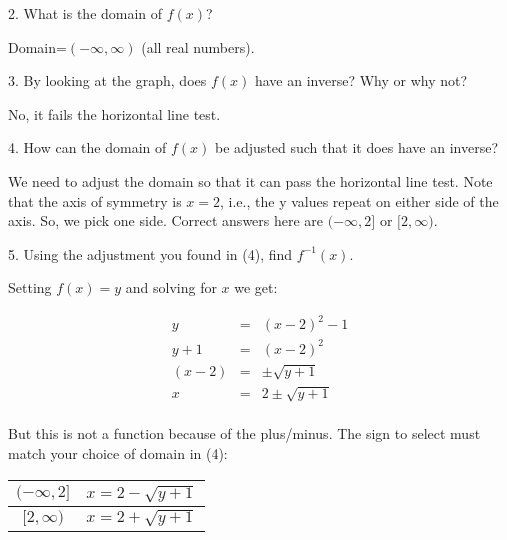\documentclass[letterpaper, 12pt]{article}
\begin{document}
2. What is the domain of $f(x)$?

\bigskip

Domain=$(-\infty,\infty)$ (all real numbers).

\bigskip

3. By looking at the graph, does $f(x)$ have an inverse? Why or why not?

\bigskip

No, it fails the horizontal line test.

\bigskip

4. How can the domain of $f(x)$ be adjusted such that it does have an inverse?

\bigskip

We need to adjust the domain so that it can pass the horizontal line test.
Note that the axis of symmetry is $x=2$, i.e., the y values repeat on either
side of the axis.  So, we pick one side.  Correct answers here are
$(-\infty,2]$ or $[2,\infty)$.

\bigskip

5. Using the adjustment you found in (4), find $f^{-1}(x)$.

Setting $f(x)=y$ and solving for $x$ we get:

\begin{eqnarray*}
y &=& (x-2)^2-1 \\
y+1 &=& (x-2)^2 \\
(x-2) &=& \pm\sqrt{y+1} \\
x &=& 2\pm\sqrt{y+1} \\
\end{eqnarray*}

But this is not a function because of the plus/minus.  The sign to select must
match your choice of domain in (4):

\bigskip

\begin{tabular}{|c|c|}
\hline
$(-\infty,2]$ & $x=2-\sqrt{y+1}$ \\
\hline
$[2,\infty)$ & $x=2+\sqrt{y+1}$ \\
\hline
\end{tabular}
\end{document}
